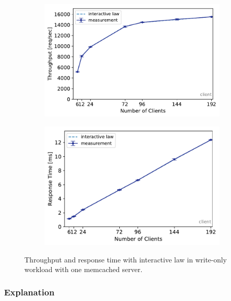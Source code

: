 \documentclass[report.tex]{subfiles}
\begin{document}
\begin{figure}
	\begin{subfigure}[b]{.49\linewidth}
		\centering
		\includegraphics[width=\linewidth]{data/exp21_wo_tp_nc.pdf}
	\end{subfigure}\hfill
	\begin{subfigure}[b]{.49\linewidth}
		\centering
		\includegraphics[width=\linewidth]{data/exp21_wo_rt_nc.pdf}
	\end{subfigure}%
	\caption{Throughput and response time with interactive law in write-only workload with one memcached server.}
	\label{exp21_wo_nc}
\end{figure}



\subsubsection{Explanation}
\end{document}
